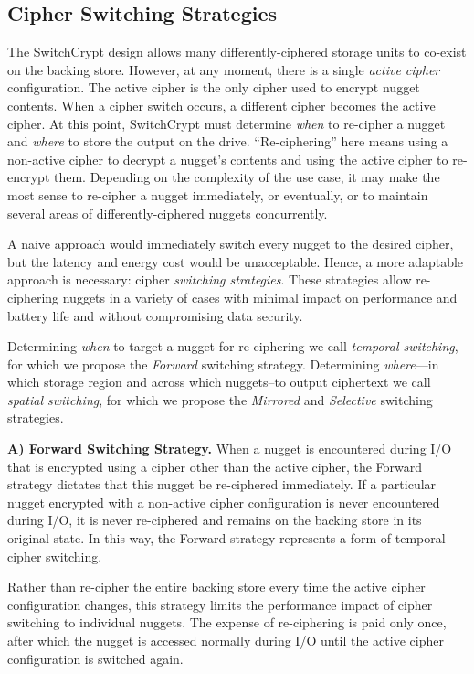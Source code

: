 \subsection{Cipher Switching Strategies} \label{subsec:strategies}

The SwitchCrypt design allows many differently-ciphered storage units to
co-exist on the backing store. However, at any moment, there is a single
\emph{active cipher} configuration. The active cipher is the only cipher used to
encrypt nugget contents. When a cipher switch occurs, a different cipher becomes
the active cipher. At this point, SwitchCrypt must determine \emph{when} to
re-cipher a nugget and \emph{where} to store the output on the drive.
``Re-ciphering'' here means using a non-active cipher to decrypt a nugget's
contents and using the active cipher to re-encrypt them. Depending on the
complexity of the use case, it may make the most sense to re-cipher a nugget
immediately, or eventually, or to maintain several areas of differently-ciphered
nuggets concurrently.

A naive approach would immediately switch every nugget to the desired cipher,
but the latency and energy cost would be unacceptable. Hence, a more adaptable
approach is necessary: cipher \emph{switching strategies}. These strategies
allow re-ciphering nuggets in a variety of cases with minimal impact on
performance and battery life and without compromising data security.

Determining \emph{when} to target a nugget for re-ciphering we call
\emph{temporal switching}, for which we propose the \emph{Forward} switching
strategy. Determining \emph{where}---in which storage region and across which
nuggets--to output ciphertext we call \emph{spatial switching}, for which we
propose the \emph{Mirrored} and \emph{Selective} switching strategies.

\textbf{A) Forward Switching Strategy.} When a nugget is encountered during I/O
that is encrypted using a cipher other than the active cipher, the Forward
strategy dictates that this nugget be re-ciphered immediately. If a particular
nugget encrypted with a non-active cipher configuration is never encountered
during I/O, it is never re-ciphered and remains on the backing store in its
original state. In this way, the Forward strategy represents a form of temporal
cipher switching.

Rather than re-cipher the entire backing store every time the active cipher
configuration changes, this strategy limits the performance impact of cipher
switching to individual nuggets. The expense of re-ciphering is paid only once,
after which the nugget is accessed normally during I/O until the active cipher
configuration is switched again.

